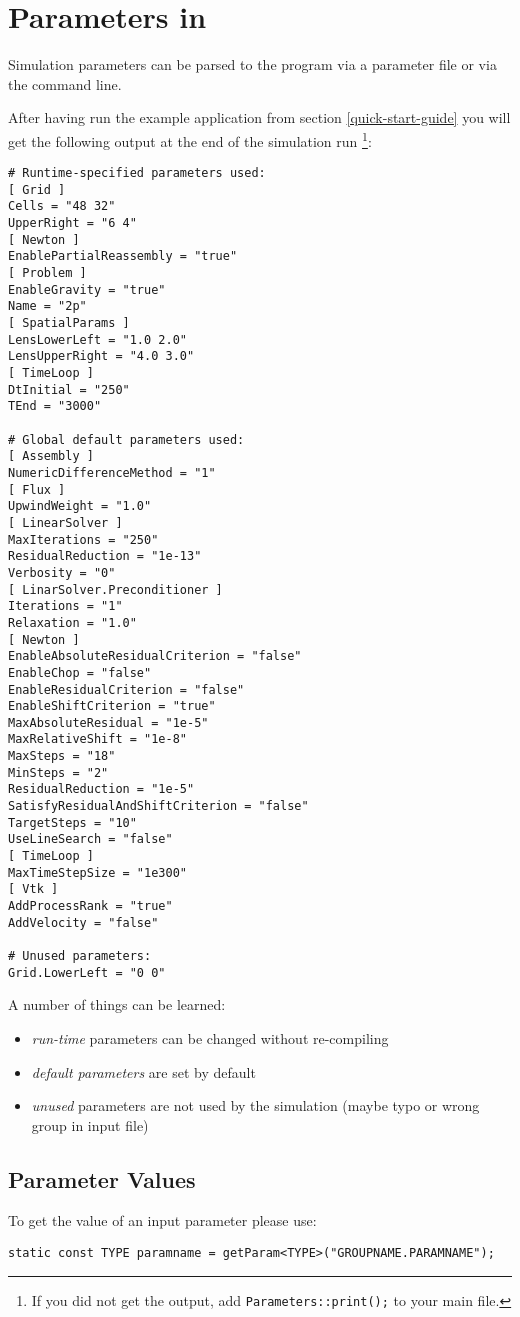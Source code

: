 \section{Parameters in \Dumux}
\label{sc_parameterfiles}
Simulation parameters can be parsed to the program via a parameter file or via the command line.

After having run the example application from section \ref{quick-start-guide} you will
get the following output at the end of the simulation run
\footnote{If you did not get the output, add \texttt{Parameters::print();} to your main file.}:
\begin{lstlisting}[style=Bash]
# Runtime-specified parameters used:
[ Grid ]
Cells = "48 32"
UpperRight = "6 4"
[ Newton ]
EnablePartialReassembly = "true"
[ Problem ]
EnableGravity = "true"
Name = "2p"
[ SpatialParams ]
LensLowerLeft = "1.0 2.0"
LensUpperRight = "4.0 3.0"
[ TimeLoop ]
DtInitial = "250"
TEnd = "3000"

# Global default parameters used:
[ Assembly ]
NumericDifferenceMethod = "1"
[ Flux ]
UpwindWeight = "1.0"
[ LinearSolver ]
MaxIterations = "250"
ResidualReduction = "1e-13"
Verbosity = "0"
[ LinarSolver.Preconditioner ]
Iterations = "1"
Relaxation = "1.0"
[ Newton ]
EnableAbsoluteResidualCriterion = "false"
EnableChop = "false"
EnableResidualCriterion = "false"
EnableShiftCriterion = "true"
MaxAbsoluteResidual = "1e-5"
MaxRelativeShift = "1e-8"
MaxSteps = "18"
MinSteps = "2"
ResidualReduction = "1e-5"
SatisfyResidualAndShiftCriterion = "false"
TargetSteps = "10"
UseLineSearch = "false"
[ TimeLoop ]
MaxTimeStepSize = "1e300"
[ Vtk ]
AddProcessRank = "true"
AddVelocity = "false"

# Unused parameters:
Grid.LowerLeft = "0 0"
\end{lstlisting}

A number of things can be learned:
\begin{itemize}
  \item \emph{run-time} parameters can be changed without re-compiling
  \item \emph{default parameters} are set by default
  \item \emph{unused} parameters are not used by the simulation (maybe typo or wrong group in input file)
\end{itemize}


\subsection{Parameter Values}
To get the value of an input parameter please use:
\begin{lstlisting}[name=propsyscars,style=DumuxCode]
static const TYPE paramname = getParam<TYPE>("GROUPNAME.PARAMNAME");
\end{lstlisting}

